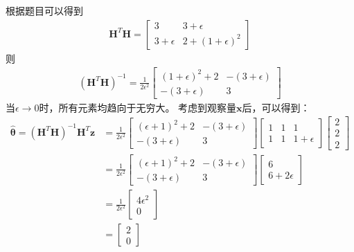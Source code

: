 \documentclass[fontset=windows]{article}
\numberwithin{figure}{section}
\begin{document}
根据题目可以得到
\begin{align*}
	\mathbf{H}^T\mathbf{H}=
	\begin{bmatrix}
		3          & 3+\epsilon       \\
		3+\epsilon & 2+(1+\epsilon)^2
	\end{bmatrix}
\end{align*}
则
\begin{align*}
	(\mathbf{H}^T\mathbf{H})^{-1}=\frac{1}{2\epsilon^2}
	\begin{bmatrix}
		(1+\epsilon)^2+2 & -(3+\epsilon) \\
		-(3+\epsilon)    & 3
	\end{bmatrix}
\end{align*}
当\(\epsilon \to 0\)时，所有元素均趋向于无穷大。
考虑到观察量\(\mathbf{x}\)后，可以得到：
\begin{align*}
	\hat{\boldsymbol{\theta}}=(\mathbf{H}^T\mathbf{H})^{-1}\mathbf{H}^T \mathbf{z}
	 & =\frac{1}{2\epsilon^2}
	\begin{bmatrix}
		(\epsilon+1)^2+2 & -(3+\epsilon) \\
		-(3+\epsilon)    & 3
	\end{bmatrix}
	\begin{bmatrix}
		1 & 1 & 1          \\
		1 & 1 & 1+\epsilon
	\end{bmatrix}
	\begin{bmatrix}
		2 \\
		2 \\
		2
	\end{bmatrix}            \\
	 & =\frac{1}{2\epsilon^2}
	\begin{bmatrix}
		(\epsilon+1)^2+2 & -(3+\epsilon) \\
		-(3+\epsilon)    & 3
	\end{bmatrix}
	\begin{bmatrix}
		6 \\
		6+2\epsilon
	\end{bmatrix}            \\
	 & =\frac{1}{2\epsilon^2}
	\begin{bmatrix}
		4\epsilon^2 \\
		0
	\end{bmatrix}            \\
	 & =
	\begin{bmatrix}
		2 \\
		0
	\end{bmatrix}
\end{align*}
\end{document}
